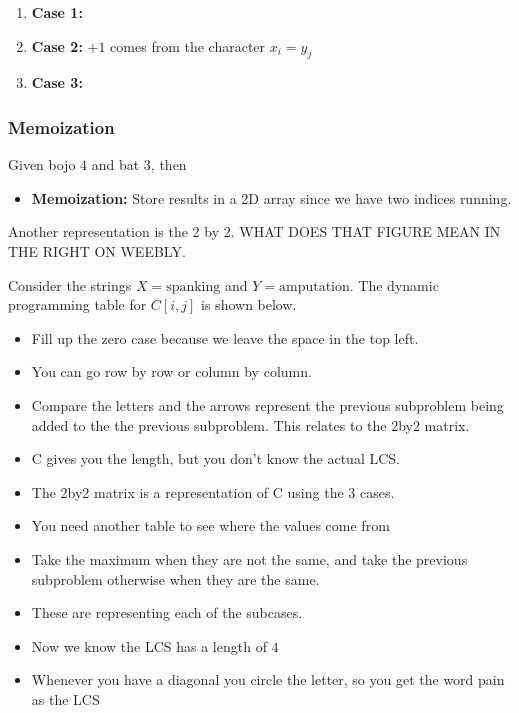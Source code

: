\begin{intuition}
    \begin{enumerate}
        \item \textbf{Case 1:}
        \item \textbf{Case 2:} $+1$ comes from the character $x_i = y_j$
        \item \textbf{Case 3:} 
    \end{enumerate}
\end{intuition}

\subsubsection{Memoization}
\begin{example}
    Given bojo $4$ and bat $3$, then 
    \begin{itemize}
        \item \textbf{Memoization:} Store results in a 2D array since we have two indices running.
    \end{itemize}
\end{example}

\begin{definition}
    Another representation is the 2 by 2. WHAT DOES THAT FIGURE MEAN IN THE RIGHT ON WEEBLY.
\end{definition}

\begin{example}
Consider the strings \(X = \text{spanking}\) and \(Y = \text{amputation}\). The dynamic programming table for \(C[i,j]\) is shown below.

\begin{itemize}
    \item Fill up the zero case because we leave the space in the top left. 
    \item You can go row by row or column by column. 
    \item Compare the letters and the arrows represent the previous subproblem being added to the the previous subproblem. This relates to the 2by2 matrix. 
    \item C gives you the length, but you don't know the actual LCS. 
    \item The 2by2 matrix is a representation of C using the 3 cases. 
    \item You need another table to see where the values come from
    \item Take the maximum when they are not the same, and take the previous subproblem otherwise when they are the same. 
    \item These are representing each of the subcases. 
    \item Now we know the LCS has a length of $4$
    \item Whenever you have a diagonal you circle the letter, so you get the word pain as the LCS
\end{itemize}

\end{example}

